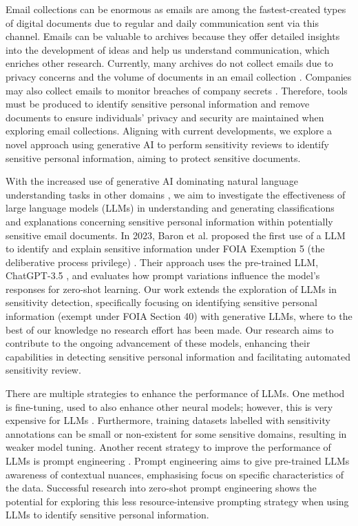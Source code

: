 Email collections can be enormous as emails are among the fastest-created types of digital documents due to regular and daily communication sent via this channel. Emails can be valuable to archives because they offer detailed insights into the development of ideas and help us understand communication, which enriches other research. Currently, many archives do not collect emails due to privacy concerns and the volume of documents in an email collection \cite{TFTAEA:18}. Companies may also collect emails to monitor breaches of company secrets \cite{iqbal2021search}. Therefore, tools must be produced to identify sensitive personal information and remove documents to ensure individuals' privacy and security are maintained when exploring email collections. Aligning with current developments, we explore a novel approach using generative AI to perform sensitivity reviews to identify sensitive personal information, aiming to protect sensitive documents.

With the increased use of generative AI dominating natural language understanding tasks in other domains \cite{qiu2020pre, adiwardana2020towards, roller2020recipes, openai2023gpt}, we aim to investigate the effectiveness of large language models (LLMs) in understanding and generating classifications and explanations concerning sensitive personal information within potentially sensitive email documents. In 2023, Baron et al. proposed the first use of a LLM to identify and explain sensitive information under FOIA Exemption 5 (the deliberative process privilege) \cite{baron2023using}. Their approach uses the pre-trained LLM, ChatGPT-3.5 \cite{brown2020language}, and evaluates how prompt variations influence the model's responses for zero-shot learning. Our work extends the exploration of LLMs in sensitivity detection, specifically focusing on identifying sensitive personal information (exempt under FOIA Section 40) with generative LLMs, where to the best of our knowledge no research effort has been made. Our research aims to contribute to the ongoing advancement of these models, enhancing their capabilities in detecting sensitive personal information and facilitating automated sensitivity review.

There are multiple strategies to enhance the performance of LLMs. One method is fine-tuning, used to also enhance other neural models; however, this is very expensive for LLMs \cite{naveed2023comprehensive}. Furthermore, training datasets labelled with sensitivity annotations can be small or non-existent for some sensitive domains, resulting in weaker model tuning. Another recent strategy to improve the performance of LLMs is prompt engineering \cite{liu2023pre}. Prompt engineering aims to give pre-trained LLMs awareness of contextual nuances, emphasising focus on specific characteristics of the data. Successful research into zero-shot prompt engineering \cite{wei2023zero, kojima2022large} shows the potential for exploring this less resource-intensive prompting strategy when using LLMs to identify sensitive personal information.

